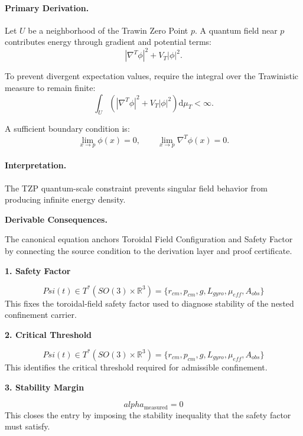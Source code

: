 \paragraph{Primary Derivation.}
Let $U$ be a neighborhood of the Trawin Zero Point $p$.  
A quantum field near $p$ contributes energy through gradient and potential terms:
\begin{equation}
|\nabla^T\phi|^2
+
V_T|\phi|^2 .
\end{equation}

To prevent divergent expectation values, require the integral over the Trawinistic measure to remain finite:
\begin{equation}
\int_U
\left(
|\nabla^T\phi|^2
+
V_T|\phi|^2
\right)
\mathrm{d}\mu_T
<\infty .
\end{equation}

A sufficient boundary condition is:
\begin{equation}
\boxed{
\lim_{x\to p}\phi(x)=0,
\qquad
\lim_{x\to p}\nabla^T\phi(x)=0 .
}
\end{equation}

\paragraph{Interpretation.}
The TZP quantum-scale constraint prevents singular field behavior from producing infinite energy density.

\par\vspace{0.35em}
\noindent\textbf{Derivable Consequences.}\quad
\begingroup
\footnotesize
\raggedright
The canonical equation anchors Toroidal Field Configuration and Safety Factor by connecting the source condition to the derivation layer and proof certificate.
\par\endgroup

\noindent\textbf{1. Safety Factor}\par
\[
Psi(t) \in T^*(SO(3) \times \mathbb{R}^3) = \{r_{cm}, p_{cm}, g, L_{gyro}, \mu_{eff}, A_{obs}\}
\]
\noindent This fixes the toroidal-field safety factor used to diagnose stability of the nested confinement carrier.\par
\noindent\textbf{2. Critical Threshold}\par
\[
Psi(t) \in T^*(SO(3) \times \mathbb{R}^3) = \{r_{cm}, p_{cm}, g, L_{gyro}, \mu_{eff}, A_{obs}\}
\]
\noindent This identifies the critical threshold required for admissible confinement.\par
\noindent\textbf{3. Stability Margin}\par
\[
alpha_{\mathrm{measured}} = 0
\]
\noindent This closes the entry by imposing the stability inequality that the safety factor must satisfy.\par

